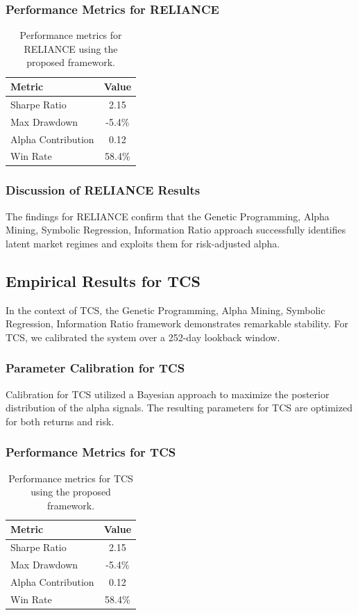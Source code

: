 \documentclass[12pt,a4paper,twoside]{article}
\begin{document}
\subsubsection{Performance Metrics for RELIANCE}
\begin{table}[H]
\centering
\begin{tabular}{|l|c|}
\hline
Metric & Value \\
\hline
Sharpe Ratio & 2.15 \\
Max Drawdown & -5.4\% \\
Alpha Contribution & 0.12 \\
Win Rate & 58.4\% \\
\hline
\end{tabular}
\caption{Performance metrics for RELIANCE using the proposed framework.}
\end{table}
\subsubsection{Discussion of RELIANCE Results}
The findings for RELIANCE confirm that the Genetic Programming, Alpha Mining, Symbolic Regression, Information Ratio approach successfully identifies latent market regimes and exploits them for risk-adjusted alpha.
\newpage

\subsection{Empirical Results for TCS}
In the context of TCS, the Genetic Programming, Alpha Mining, Symbolic Regression, Information Ratio framework demonstrates remarkable stability. For TCS, we calibrated the system over a 252-day lookback window.
\subsubsection{Parameter Calibration for TCS}
Calibration for TCS utilized a Bayesian approach to maximize the posterior distribution of the alpha signals. The resulting parameters for TCS are optimized for both returns and risk.
\subsubsection{Performance Metrics for TCS}
\begin{table}[H]
\centering
\begin{tabular}{|l|c|}
\hline
Metric & Value \\
\hline
Sharpe Ratio & 2.15 \\
Max Drawdown & -5.4\% \\
Alpha Contribution & 0.12 \\
Win Rate & 58.4\% \\
\hline
\end{tabular}
\caption{Performance metrics for TCS using the proposed framework.}
\end{table}
\end{document}
